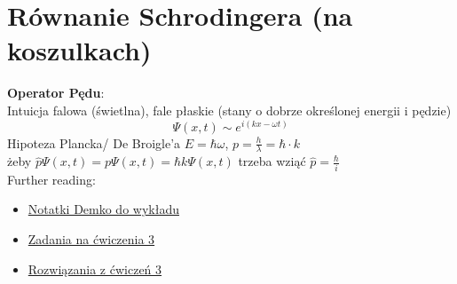 \documentclass[12pt,a4paper]{report}
\newcommand{\link}[2]{{\color{cyan} \href{#1}{#2}}}
\renewcommand{\emph}{\textbf}
\newenvironment{lecture}[1]{\par\medskip
   \noindent\chapter{#1} \rmfamily}{\medskip}
\begin{document}
\begin{lecture}{Równanie Schrodingera (na koszulkach)}
\emph{Operator Pędu}:\\
Intuicja falowa (świetlna), fale płaskie (stany o dobrze określonej energii i pędzie)
\[
    \Psi(x, t) \sim e^{i (kx - \omega t)}
\]
Hipoteza Plancka/ De Broigle'a $E = \hbar \omega$,  $p = \frac{h}{\lambda} = \hbar \cdot k$\\
żeby $\hat{p} \Psi(x, t) = p \Psi(x, t) = \hbar k \Psi(x, t)$ trzeba wziąć $\hat{p} = \frac{\hbar}{i}$\\

Further reading:
\begin{itemize}
    \item \link{http://studenci.fuw.edu.pl/~kc427902/Prezentacje_Kwanty/wyklad3-ewolucja.pdf}{Notatki Demko do wykładu}
    \item \link{http://studenci.fuw.edu.pl/~kc427902/Prezentacje_Kwanty/cwiczenia3.pdf}{Zadania na ćwiczenia 3}
    \item \link{http://studenci.fuw.edu.pl/~kc427902/Prezentacje_Kwanty/cwiczenia3-sol.pdf}{Rozwiązania z ćwiczeń 3}
\end{itemize}

\end{lecture}

\end{document}
